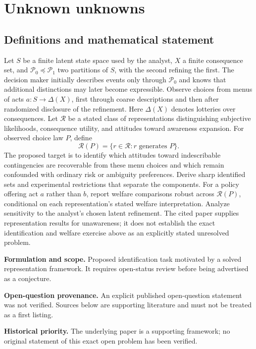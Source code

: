 \documentclass[11pt]{article}
\begin{document}
\section*{Unknown unknowns}\label{30007557}
\subsection{Definitions and mathematical statement}
Let \(S\) be a finite latent state space used by the analyst, \(X\) a finite consequence set, and \(\mathcal P_0\preceq\mathcal P_1\) two partitions of \(S\), with the second refining the first. The decision maker initially describes events only through \(\mathcal P_0\) and knows that additional distinctions may later become expressible. Observe choices from menus of acts \(a:S\to\Delta(X)\), first through coarse descriptions and then after randomized disclosure of the refinement. Here \(\Delta(X)\) denotes lotteries over consequences. Let \(\mathcal R\) be a stated class of representations distinguishing subjective likelihoods, consequence utility, and attitudes toward awareness expansion. For observed choice law \(P\), define
\[
 \mathcal R(P)=\{r\in\mathcal R:r\text{ generates }P\}.
\]
The proposed target is to identify which attitudes toward indescribable contingencies are recoverable from these menu choices and which remain confounded with ordinary risk or ambiguity preferences. Derive sharp identified sets and experimental restrictions that separate the components. For a policy offering act \(a\) rather than \(b\), report welfare comparisons robust across \(\mathcal R(P)\), conditional on each representation's stated welfare interpretation. Analyze sensitivity to the analyst's chosen latent refinement. The cited paper supplies representation results for unawareness; it does not establish the exact identification and welfare exercise above as an explicitly stated unresolved problem.

\par\textbf{Formulation and scope.} Proposed identification task motivated by a solved representation framework. It requires open-status review before being advertised as a conjecture.

\par\textbf{Open-question provenance.} An explicit published open-question statement was not verified. Sources below are supporting literature and must not be treated as a first listing.

\par\textbf{Historical priority.} The underlying paper is a supporting framework; no original statement of this exact open problem has been verified.
\end{document}
